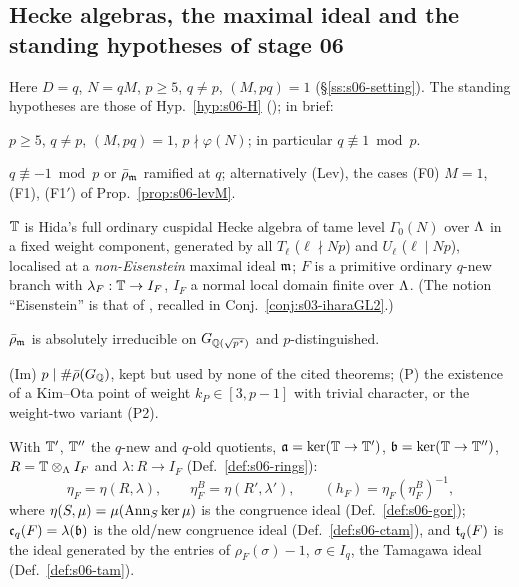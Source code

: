 \subsection{Hecke algebras, the maximal ideal and the standing hypotheses of stage 06}\label{ss:s00-H}
Here $D=q$, $N=qM$, $p\ge5$, $q\ne p$, $(M,pq)=1$ (\S\ref{ss:s06-setting}). The standing hypotheses are those of
Hyp.~\ref{hyp:s06-H} (\sthyp); in brief:
\begin{description}[leftmargin=0pt,itemsep=3pt]
\item[(H0)] $p\ge5$, $q\ne p$, $(M,pq)=1$, $p\nmid\varphi(N)$; in particular $q\not\equiv1\bmod p$.
\item[(H0$^-$) or (Lev)] $q\not\equiv-1\bmod p$ or $\bar\rho_{\mathfrak{m}}$ ramified at $q$; alternatively (Lev), the cases (F0) $M=1$, (F1), (F1$'$)
  of Prop.~\ref{prop:s06-levM}.
\item[(H1)] $\mathbb{T}$ is Hida's full ordinary cuspidal Hecke algebra of tame level $\Gamma_0(N)$ over $\Lambda$ in a fixed weight component,
  generated by all $T_\ell$ ($\ell\nmid Np$) and $U_\ell$ ($\ell\mid Np$), localised at a \emph{non-Eisenstein} maximal ideal $\mathfrak{m}$; $F$ is
  a primitive ordinary $q$-new branch with $\lambda_F:\mathbb{T}\to I_F$, $I_F$ a normal local domain finite over $\Lambda$. (The notion
  ``Eisenstein'' is that of \cite{DT}, recalled in Conj.~\ref{conj:s03-iharaGL2}.)
\item[(H2)] $\bar\rho_{\mathfrak{m}}$ is absolutely irreducible on $G_{\mathbb{Q}(\sqrt{p^*})}$ and $p$-distinguished.
\item[(Im), (P)] (Im) $p\mid\#\bar\rho(G_{\mathbb{Q}})$, kept but used by none of the cited theorems; (P) the existence of a Kim--Ota point of
  weight $k_P\in[3,p-1]$ with trivial character, or the weight-two variant (P2).
\end{description}
\noindent With $\mathbb{T}'$, $\mathbb{T}''$ the $q$-new and $q$-old quotients, $\mathfrak{a}=\ker(\mathbb{T}\to\mathbb{T}')$, $\mathfrak{b}=\ker(\mathbb{T}\to\mathbb{T}'')$, $R=\mathbb{T}\otimes_\Lambda I_F$ and
$\lambda:R\to I_F$ (Def.~\ref{def:s06-rings}):
\[\eta_F=\eta(R,\lambda),\qquad \eta^B_F=\eta(R',\lambda'),\qquad (h_F)=\eta_F(\eta^B_F)^{-1},\]
where $\eta(S,\mu)=\mu(\operatorname{Ann}_S\ker\mu)$ is the congruence ideal (Def.~\ref{def:s06-gor}); $\mathfrak{c}_q(F)=\lambda(\mathfrak{b})$ is the old/new
congruence ideal (Def.~\ref{def:s06-ctam}), and $\mathfrak{t}_q(F)$ is the ideal generated by the entries of $\rho_F(\sigma)-1$, $\sigma\in I_q$,
the Tamagawa ideal (Def.~\ref{def:s06-tam}).

